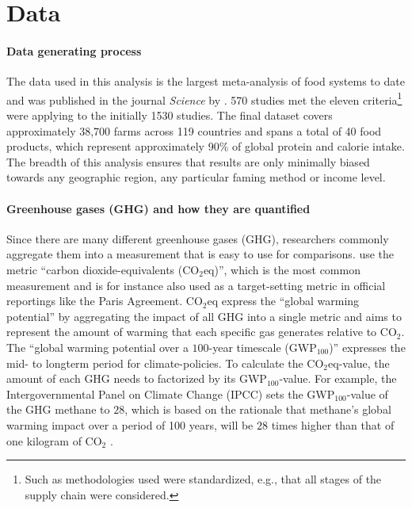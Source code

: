 \documentclass{article}
\begin{document}
\section{Data}
\label{data}
\paragraph{Data generating process} \label{dataGen}
The data used in this analysis  is the largest meta-analysis of food systems to date and was published in the journal \textit{Science} by \citet{Poore2018}.
570 studies met the eleven criteria\footnote{Such as  methodologies used were standardized, e.g., that all stages of the supply chain were considered.} \citet{Poore2018}  were applying to the initially  1530 studies.
The final dataset covers approximately 38,700 farms across 119 countries and spans a total of 40 food products, which represent approximately 90\% of global protein and calorie intake. The breadth of this analysis ensures that results are only minimally biased towards any geographic region,  any particular faming method or income level.
\paragraph*{Greenhouse gases (GHG) and how they are quantified}
Since there are many different greenhouse gases (GHG), researchers commonly aggregate them into a measurement that is easy to use for comparisons. 
\citet{Poore2018} use the metric 
``carbon dioxide-equivalents (CO$_{2}$eq)'', which is the most common measurement and is for instance  also used as a target-setting metric in official reportings like the Paris Agreement. CO$_{2}$eq express the ``global warming potential'' by aggregating the impact of all GHG into a single metric  and  aims to represent the amount of warming that each specific gas generates relative to CO$_2$. The ``global warming potential over a $100$-year timescale (GWP$_{100}$)'' expresses the mid- to longterm period for climate-policies. To calculate the CO$_{2}$eq-value, the amount of each GHG needs to factorized by its GWP$_{100}$-value. For example, the Intergovernmental Panel on Climate Change (IPCC) sets the GWP$_{100}$-value of the GHG  methane to $28$, which is based on the rationale that methane's global warming impact over a period of 100 years, will be $28$ times higher than that of one kilogram of CO$_2$ \cite{IPCC}.
\end{document}
